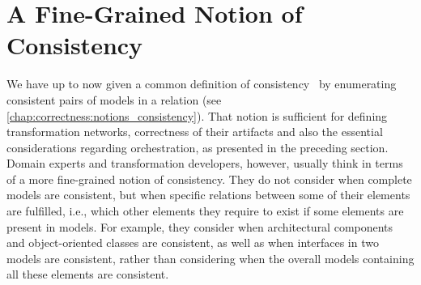 \section{A Fine-Grained Notion of Consistency}
\label{chap:correctness:finegrained}




We have up to now given a common definition of consistency~\cite{stevens2010sosym} by enumerating consistent pairs of models in a relation (see \autoref{chap:correctness:notions_consistency}).
That notion is sufficient for defining transformation networks, correctness of their artifacts and also the essential considerations regarding orchestration, as presented in the preceding section.
Domain experts and transformation developers, however, usually think in terms of a more fine-grained notion of consistency.
They do not consider when complete models are consistent, but when specific relations between some of their elements are fulfilled, i.e., which other elements they require to exist if some elements are present in models.
For example, they consider when architectural components and object-oriented classes are consistent, as well as when interfaces in two models are consistent, rather than considering when the overall models containing all these elements are consistent.

